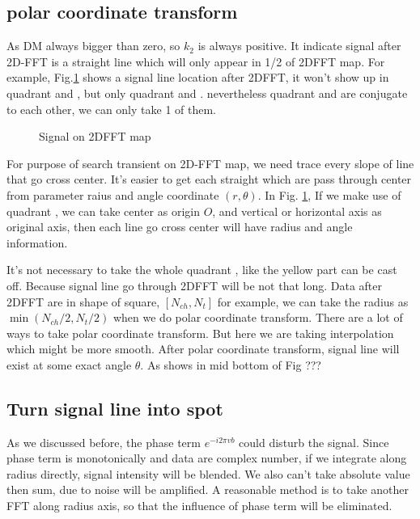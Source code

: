 \documentclass[twocolumn]{aastex61}
\begin{document}
\subsection{polar coordinate transform}

As DM always bigger than zero, so $k_2$ is always positive. It indicate signal after 2D-FFT is a straight line which will only appear in 1/2 of 2DFFT map. For example, Fig.\ref{fig:2DFFT} shows a signal line location after 2DFFT, it won't show up in quadrant \uppercase\expandafter{} and  \uppercase\expandafter{}, but only quadrant \uppercase\expandafter{} and \uppercase\expandafter{}. nevertheless quadrant \uppercase\expandafter{} and \uppercase\expandafter{} are conjugate to each other, we can only take 1 of them.

\begin{figure}[ht!]
\caption{Signal on 2DFFT map \label{fig:2DFFT}}
\end{figure}

For purpose of search transient on 2D-FFT map, we need trace every slope of line that go cross center. It's easier to get each straight which are pass through center from parameter raius and angle  coordinate $(r,\theta)$. In Fig. \ref{fig:2DFFT},  If we make use of quadrant \uppercase\expandafter{}, we can take center as origin $O$, and vertical or horizontal axis as original axis, then each line go cross center will have radius and angle information. 

It's not necessary to take the whole quadrant \uppercase\expandafter{}, like the yellow part can be cast off. Because signal line go through 2DFFT will be not that long. Data after 2DFFT are in shape of square, $[N_{ch},N_t]$ for example, we can take the radius as ${\min(N_{ch}/2,N_t/2)}$ when we do polar coordinate transform. There are a lot of ways to take polar coordinate transform. But here we are taking interpolation which might be more smooth. After polar coordinate transform, signal line will exist at some exact angle $\theta$. As shows in mid bottom of Fig ??? 

\subsection{Turn signal line into spot}
As we discussed before, the phase term $e^{-i2\pi vb}$ could disturb the signal. Since phase term is monotonically and data are complex number, if we integrate along radius directly, signal intensity will be blended. We also can't take absolute value then sum,  due to noise will be amplified. A reasonable method is to take another FFT along radius axis, so that the influence of phase term will be eliminated. 
\end{document}
